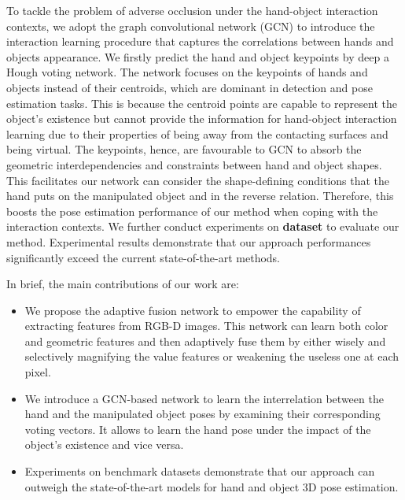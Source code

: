 To tackle the problem of adverse occlusion under the hand-object interaction contexts, we adopt the graph convolutional network (GCN) to introduce the interaction learning procedure that captures the correlations between hands and objects appearance. We firstly predict the hand and object keypoints by deep a Hough voting network. The network focuses on the keypoints of hands and objects instead of their centroids, which are dominant in detection and pose estimation tasks. This is because the centroid points are capable to represent the object's existence but cannot provide the information for hand-object interaction learning due to their properties of being away from the contacting surfaces and being virtual. The keypoints, hence, are favourable to GCN to absorb the geometric interdependencies and constraints between hand and object shapes. This facilitates our network can consider the shape-defining conditions that the hand puts on the manipulated object and in the reverse relation. Therefore, this boosts the pose estimation performance of our method when coping with the interaction contexts. We further conduct experiments on \textbf{dataset} to evaluate our method. Experimental results demonstrate that our approach performances significantly exceed the current state-of-the-art methods.

In brief, the main contributions of our work are:

\begin{itemize}
	\item We propose the adaptive fusion network to empower the capability of extracting features from RGB-D images. This network can learn both color and geometric features and then adaptively fuse them by either wisely and selectively magnifying the value features or weakening the useless one at each pixel. 
	 
	\item We introduce a GCN-based network to learn the interrelation between the hand and the manipulated object poses by examining their corresponding voting vectors. It allows to learn the hand pose under the impact of the object's existence and vice versa.
	 
	\item Experiments on benchmark datasets demonstrate that our approach can outweigh the state-of-the-art models for hand and object 3D pose estimation.
\end{itemize}



